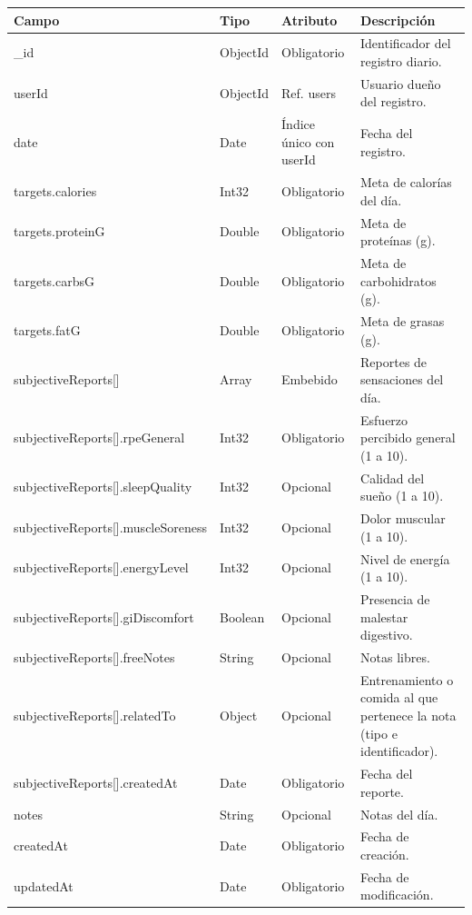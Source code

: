 {\footnotesize
\renewcommand{\arraystretch}{1.2}
\begin{longtable}{|>{\raggedright\arraybackslash}p{4.7cm}|>{\raggedright\arraybackslash}p{1.8cm}|>{\raggedright\arraybackslash}p{2.3cm}|>{\raggedright\arraybackslash}p{5.4cm}|}
    \hline
    \rowcolor[HTML]{EFEFEF}
    \textbf{Campo} & \textbf{Tipo} & \textbf{Atributo} & \textbf{Descripción} \\ \hline
    \endhead
    \_id & ObjectId & Obligatorio & Identificador del registro diario. \\ \hline
    userId & ObjectId & Ref. users & Usuario dueño del registro. \\ \hline
    date & Date & Índice único con userId & Fecha del registro. \\ \hline
    targets.\allowbreak calories & Int32 & Obligatorio & Meta de calorías del día. \\ \hline
    targets.\allowbreak proteinG & Double & Obligatorio & Meta de proteínas (g). \\ \hline
    targets.\allowbreak carbsG & Double & Obligatorio & Meta de carbohidratos (g). \\ \hline
    targets.\allowbreak fatG & Double & Obligatorio & Meta de grasas (g). \\ \hline
    subjectiveReports[]\allowbreak  & Array & Embebido & Reportes de sensaciones del día. \\ \hline
    subjectiveReports[]\allowbreak .\allowbreak rpeGeneral & Int32 & Obligatorio & Esfuerzo percibido general (1 a 10). \\ \hline
    subjectiveReports[]\allowbreak .\allowbreak sleepQuality & Int32 & Opcional & Calidad del sueño (1 a 10). \\ \hline
    subjectiveReports[]\allowbreak .\allowbreak muscleSoreness & Int32 & Opcional & Dolor muscular (1 a 10). \\ \hline
    subjectiveReports[]\allowbreak .\allowbreak energyLevel & Int32 & Opcional & Nivel de energía (1 a 10). \\ \hline
    subjectiveReports[]\allowbreak .\allowbreak giDiscomfort & Boolean & Opcional & Presencia de malestar digestivo. \\ \hline
    subjectiveReports[]\allowbreak .\allowbreak freeNotes & String & Opcional & Notas libres. \\ \hline
    subjectiveReports[]\allowbreak .\allowbreak relatedTo & Object & Opcional & Entrenamiento o comida al que pertenece la nota (tipo e identificador). \\ \hline
    subjectiveReports[]\allowbreak .\allowbreak createdAt & Date & Obligatorio & Fecha del reporte. \\ \hline
    notes & String & Opcional & Notas del día. \\ \hline
    createdAt & Date & Obligatorio & Fecha de creación. \\ \hline
    updatedAt & Date & Obligatorio & Fecha de modificación. \\ \hline
\end{longtable}
}
